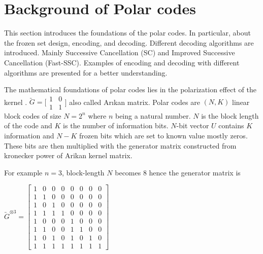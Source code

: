 \section{Background of Polar codes} 
This section introduces the foundations of the polar codes. In particular, about the frozen set design, encoding, and decoding. Different decoding algorithms are introduced. Mainly Successive Cancellation (SC) and Improved Successive Cancellation (Fast-SSC)\cite{fastPolarDecodersAlgoImpl}. Examples of encoding and decoding with different algorithms are presented for a better understanding.


The mathematical foundations of polar codes lies in the polarization effect of the kernel \cite{Arikan}. $ \utilde{G} = \big[\begin{smallmatrix} 1 & 0 \\ 1 & 1 \end{smallmatrix}$\big] also called Ar\i kan matrix. Polar codes are $(N,K)$ linear block codes of size $N = 2^{n}$ where $n$ being a natural number. $N$ is the block length of the code and $K$ is the number of information bits.  $N$-bit vector $U$ contains $K$ information and $N-K$ frozen bits which are set to known value mostly zeros. These bits are then multiplied with the generator matrix constructed from kronecker power\cite{kronecker} of Arikan kernel matrix.

For example $n=3$, block-length $N$ becomes $8$ hence the generator matrix is \newline

$ \utilde{G}^{\otimes 3} = \begin{bmatrix}
1 & 0 & 0 & 0 & 0 & 0 & 0 & 0\\ 
1 & 1 & 0 & 0 & 0 & 0 & 0 & 0\\ 
1 & 0 & 1 & 0 & 0 & 0 & 0 & 0\\ 
1 & 1 & 1 & 1 & 0 & 0 & 0 & 0\\ 
1 & 0 & 0 & 0 & 1 & 0 & 0 & 0\\ 
1 & 1 & 0 & 0 & 1 & 1 & 0 & 0\\ 
1 & 0 & 1 & 0 & 1 & 0 & 1 & 0\\ 
1 & 1 & 1 & 1 & 1 & 1 & 1 & 1
\end{bmatrix}$ \newline

